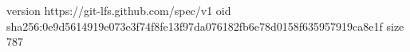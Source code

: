 version https://git-lfs.github.com/spec/v1
oid sha256:0e9d5614919e073e3f74f8fe13f97da076182fb6e78d0158f635957919ca8e1f
size 787
